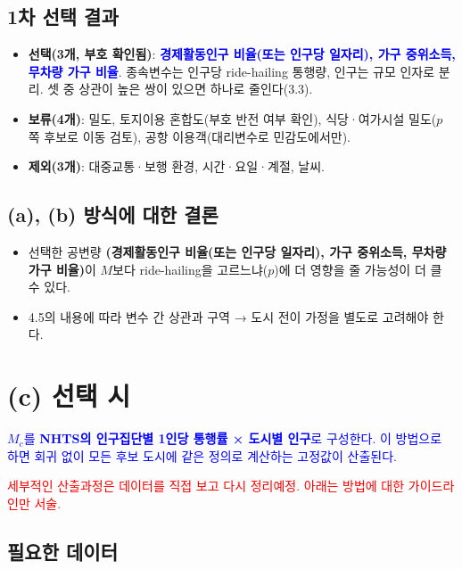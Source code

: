 \documentclass[10pt,a4paper]{article}
\newcommand{\red}[1]{\textcolor{red}{#1}}
\begin{document}
\begin{mdframed}[linecolor=red!60,linewidth=2pt]
\subsection{1차 선택 결과}
\begin{itemize}[leftmargin=*,itemsep=1pt]
\item \textbf{선택(3개, 부호 확인됨)}: \textcolor{blue}{\textbf{경제활동인구 비율(또는 인구당 일자리), 가구 중위소득, 무차량 가구 비율}}. 종속변수는 인구당 ride-hailing 통행량, 인구는 규모 인자로 분리. 셋 중 상관이 높은 쌍이 있으면 하나로 줄인다(3.3).
\item \textbf{보류(4개)}: 밀도, 토지이용 혼합도(부호 반전 여부 확인), 식당·여가시설 밀도($p$ 쪽 후보로 이동 검토), 공항 이용객(대리변수로 민감도에서만).
\item \textbf{제외(3개)}: 대중교통·보행 환경, 시간·요일·계절, 날씨.
\end{itemize}

\subsection{\textbf{(a), (b) 방식에 대한 결론}}
\begin{itemize}
    \item 선택한 공변량 \textbf{(경제활동인구 비율(또는 인구당 일자리), 가구 중위소득, 무차량 가구 비율)}이 $M$보다 ride-hailing을 고르느냐($p$)에 더 영향을 줄 가능성이 더 클 수 있다.
    \item 4.5의 내용에 따라 변수 간 상관과 구역 → 도시 전이 가정을 별도로 고려해야 한다. 
\end{itemize}

\end{mdframed}
\section{(c) 선택 시}

\textcolor{blue}{$M_c$를 \textbf{NHTS의 인구집단별 1인당 통행률 × 도시별 인구}로 구성한다. 이 방법으로 하면 회귀 없이 모든 후보 도시에 같은 정의로 계산하는 고정값이 산출된다.}

\red{세부적인 산출과정은 데이터를 직접 보고 다시 정리예정. 아래는 방법에 대한 가이드라인만 서술.}

\subsection{필요한 데이터}
\end{document}
